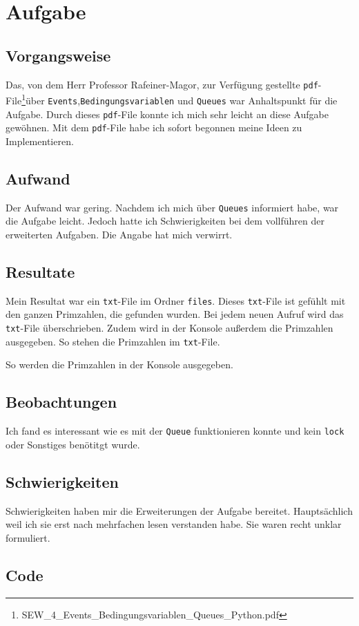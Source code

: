 
\section{Aufgabe}
\subsection{Vorgangsweise}
Das, von dem Herr Professor Rafeiner-Magor, zur Verfügung gestellte \verb|pdf|-File\footnote{SEW\_4\_Events\_Bedingungsvariablen\_Queues\_Python.pdf}\space über \verb|Events|,\space\verb|Bedingungsvariablen| und \verb|Queues| war Anhaltspunkt für die Aufgabe. Durch dieses \verb|pdf|-File konnte ich mich sehr leicht an diese Aufgabe gewöhnen. Mit dem \verb|pdf|-File habe ich sofort begonnen meine Ideen zu Implementieren.
\subsection{Aufwand}
Der Aufwand war gering. Nachdem ich mich über \verb|Queues| informiert habe, war die Aufgabe leicht. Jedoch hatte ich Schwierigkeiten bei dem vollführen der erweiterten Aufgaben. Die Angabe hat mich verwirrt.
\subsection{Resultate}
Mein Resultat war ein \verb|txt|-File im Ordner \verb|files|. Dieses \verb|txt|-File ist gefühlt mit den ganzen Primzahlen, die gefunden wurden. Bei jedem neuen Aufruf wird das \verb|txt|-File überschrieben. Zudem wird in der Konsole außerdem die Primzahlen ausgegeben.
So stehen die Primzahlen im \verb|txt|-File.

So werden die Primzahlen in der Konsole ausgegeben.

\subsection{Beobachtungen}
Ich fand es interessant wie es mit der \verb|Queue| funktionieren konnte und kein \verb|lock| oder Sonstiges benötitgt wurde.
\subsection{Schwierigkeiten}
Schwierigkeiten haben mir die Erweiterungen der Aufgabe bereitet. Hauptsächlich weil ich sie erst nach mehrfachen lesen verstanden habe. Sie waren recht unklar formuliert.
\subsection{Code}


